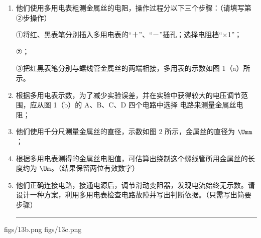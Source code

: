 \documentclass[\gkver]{gaokaozhenti}
\begin{document}
\begin{enumerate}
\begin{enumerate}
	\item
	他们使用多用电表粗测金属丝的电阻，操作过程分以下三个步骤：（请填写第②步操作）

	①将红、黑表笔分别插入多用电表的“＋”、“－”插孔；选择电阻档“×1”；

	②；

	③把红黑表笔分别与螺线管金属丝的两端相接，多用表的示数如图 1（a）所示。

	\item
	根据多用电表示数，为了减少实验误差，并在实验中获得较大的电压调节范围，应从图 1（b）的 A、B、C、D 四个电路中选择  电路来测量金属丝电阻；

	\item
	他们使用千分尺测量金属丝的直径，示数如图 2 所示，金属丝的直径为 $\Umm$；

	\item
	根据多用电表测得的金属丝电阻值，可估算出绕制这个螺线管所用金属丝的长度约为 $\Um$。（结果保留两位有效数字）

	\item
	他们正确连接电路，接通电源后，调节滑动变阻器，发现电流始终无示数。请设计一种方案，利用多用电表检查电路故障并写出判断依据。（只需写出简要步骤）

	\rule{12cm}{0.4pt}
\end{enumerate}

{figs/13b.png}
{figs/13c.png}



\end{enumerate}
\end{document}
